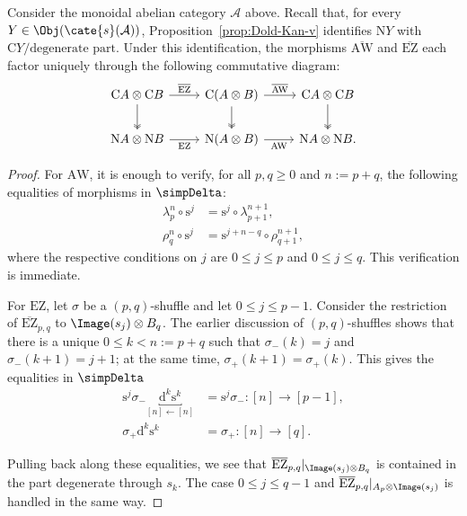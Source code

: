 \begin{lemma}\label{prop:EZ-aux}
	Consider the monoidal abelian category $\mathcal{A}$ above. Recall that,
	for every $Y\in\Obj(\cate{s}(\mathcal{A}))$,
	Proposition~\ref{prop:Dold-Kan-v} identifies $\mathrm{N}Y$ with
	$\mathrm{C}Y/\text{degenerate part}$. Under this identification, the
	morphisms $\overline{\mathrm{AW}}$ and $\overline{\mathrm{EZ}}$ each
	factor uniquely through the following commutative diagram:
	\[\begin{tikzcd}
		\mathrm{C}A \otimes \mathrm{C}B \arrow[r, "{\overline{\mathrm{EZ}}}"] \arrow[twoheadrightarrow, d] & \mathrm{C}(A \otimes B) \arrow[r, "{\overline{\mathrm{AW}}}"] \arrow[twoheadrightarrow, d] & \mathrm{C}A \otimes \mathrm{C}B \arrow[twoheadrightarrow, d] \\
		\mathrm{N}A \otimes \mathrm{N}B \arrow[r, "\mathrm{EZ}"'] & \mathrm{N}(A \otimes B) \arrow[r, "{\mathrm{AW}}"'] & \mathrm{N}A \otimes \mathrm{N}B .
	\end{tikzcd}\]
\end{lemma}
\begin{proof}
	For $\mathrm{AW}$, it is enough to verify, for all $p,q\geq0$ and
	$n:=p+q$, the following equalities of morphisms in $\simpDelta$:
	\begin{align*}
		\lambda^n_p \circ \mathrm{s}^j & = \mathrm{s}^j \circ \lambda^{n+1}_{p+1}, \\
		\rho^n_q \circ \mathrm{s}^j & = \mathrm{s}^{j+n-q} \circ \rho^{n+1}_{q+1},
	\end{align*}
	where the respective conditions on $j$ are $0\leq j\leq p$ and
	$0\leq j\leq q$. This verification is immediate.

	For $\mathrm{EZ}$, let $\sigma$ be a $(p,q)$-shuffle and let
	$0\leq j\leq p-1$. Consider the restriction of
	$\overline{\mathrm{EZ}}_{p,q}$ to $\Image(s_j)\otimes B_q$. The earlier
	discussion of $(p,q)$-shuffles shows that there is a unique
	$0\leq k<n:=p+q$ such that $\sigma_-(k)=j$ and
	$\sigma_-(k+1)=j+1$; at the same time,
	$\sigma_+(k+1)=\sigma_+(k)$. This gives the equalities in $\simpDelta$
	\begin{align*}
		\mathrm{s}^j \sigma_- \underbracket{\mathrm{d}^k \mathrm{s}^k}_{[n] \leftarrow [n]} & = \mathrm{s}^j \sigma_- : [n] \to [p-1] , \\
		\sigma_+ \mathrm{d}^k \mathrm{s}^k & = \sigma_+ : [n] \to [q] .
	\end{align*}

	Pulling back along these equalities, we see that
	$\overline{\mathrm{EZ}}_{p,q}|_{\Image(s_j)\otimes B_q}$ is contained
	in the part degenerate through $s_k$. The case $0\leq j\leq q-1$ and
	$\overline{\mathrm{EZ}}_{p,q}|_{A_p\otimes\Image(s_j)}$ is handled in
	the same way.
\end{proof}

